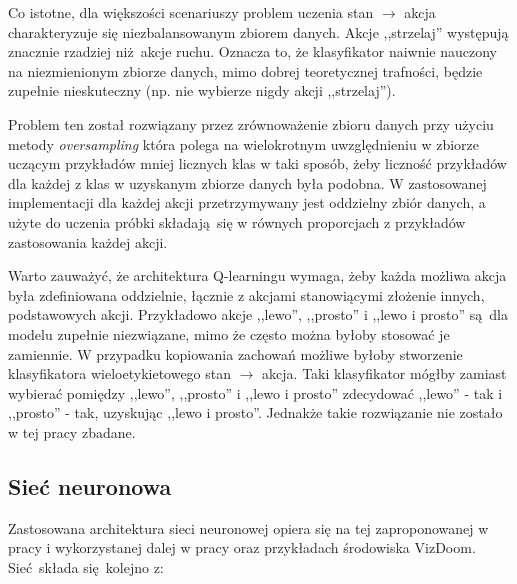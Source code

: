 \documentclass[polish,master,a4paper,oneside]{ppfcmthesis}
\begin{document}
Co istotne, dla większości scenariuszy problem uczenia stan $\to$ akcja charakteryzuje się niezbalansowanym zbiorem danych. Akcje ,,strzelaj'' występują znacznie rzadziej niż akcje ruchu. Oznacza to, że klasyfikator naiwnie nauczony na niezmienionym zbiorze danych, mimo dobrej teoretycznej trafności, będzie zupełnie nieskuteczny (np. nie wybierze nigdy akcji ,,strzelaj'').

Problem ten został rozwiązany przez zrównoważenie zbioru danych przy użyciu metody \textit{oversampling} która polega na wielokrotnym uwzględnieniu w zbiorze uczącym przykładów mniej licznych klas w taki sposób, żeby liczność przykładów dla każdej z klas w uzyskanym zbiorze danych była podobna. W zastosowanej implementacji dla każdej akcji przetrzymywany jest oddzielny zbiór danych, a użyte do uczenia próbki składają się w równych proporcjach z przykładów zastosowania każdej akcji. 

Warto zauważyć, że architektura Q-learningu wymaga, żeby każda możliwa akcja była zdefiniowana oddzielnie, łącznie z akcjami stanowiącymi złożenie innych, podstawowych akcji. Przykładowo akcje ,,lewo'', ,,prosto'' i ,,lewo i prosto'' są dla modelu zupełnie niezwiązane, mimo że często można byłoby stosować je zamiennie. W przypadku kopiowania zachowań możliwe byłoby stworzenie klasyfikatora  wieloetykietowego stan $\to$ akcja. Taki klasyfikator mógłby zamiast wybierać pomiędzy ,,lewo'', ,,prosto'' i ,,lewo i prosto'' zdecydować ,,lewo'' - tak i ,,prosto'' - tak, uzyskując ,,lewo i prosto''. Jednakże takie rozwiązanie nie zostało w tej pracy zbadane.


\subsection{Sieć neuronowa}\label{agent_net}

Zastosowana architektura sieci neuronowej opiera się na tej zaproponowanej w pracy \break \cite{mnih2015human} i wykorzystanej dalej w pracy  \cite{DBLP:journals/corr/KempkaWRTJ16} oraz przykładach środowiska VizDoom. Sieć składa się kolejno z:
\end{document}
